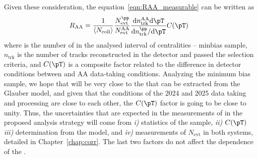 Given these consideration, the equation~\eqref{eqn:RAA_measurable} can be written as
\begin{equation}
    \RAA = 
    \frac{1}{\avgNcoll}
    \frac{N^{\pp}_{\mathrm{evt}}}{N^{\mathrm{AA}}_{\mathrm{evt}}}
    \frac{\dd n^{\mathrm{AA}}_{\mathrm{trk}}\dd\pT}
         {\dd n^{\pp}_{\mathrm{trk}}/\dd\pT}C(\pT)
\end{equation}
where \avgNcoll is the number of \Ncoll in the analysed interval of centralities -- minbias sample, $n_{\mathrm{trk}}$ is the number of tracks reconstructed in the detector and passed the selection criteria, and $C(\pT)$ is a composite factor related to the difference in detector conditions between \pp and $\text{AA}$ data-taking conditions. Analyzing the minimum bias sample, we hope that \avgNcoll will be very close to the \Ncoll that can be extracted from the Glauber model, and given that the conditions of the 2024 and 2025 data taking and processing are close to each other, the $C(\pT)$ factor is going to be close to unity. Thus, the uncertainties that are expected in the measurements of \RAA in the proposed analysis strategy will come from \textit{i)} statistics of the \OO sample, \textit{ii)} $C(\pT)$ \textit{iii)} \Ncoll determination from the model, and \textit{iv)} measurements of $N_{\mathrm{evt}}$ in both systems, detailed in Chapter~\ref{chap:corr}. The last two factors do not affect the \pT dependence of the \RAA.




